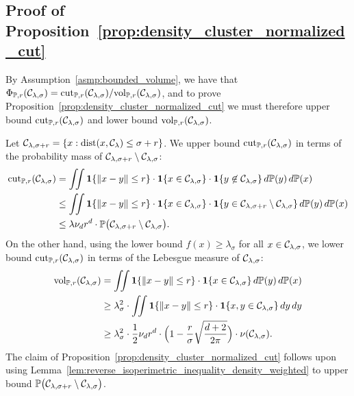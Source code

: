 \subsection{Proof of Proposition~\ref{prop:density_cluster_normalized_cut}}
\label{subsec:density_cluster_ncut}
By Assumption~\ref{asmp:bounded_volume}, we have that $\Phi_{\mathbb{P},r}(\mathcal{C}_{\lambda,\sigma}) = \mathrm{cut}_{\mathbb{P},r}(\mathcal{C}_{\lambda,\sigma})/\mathrm{vol}_{\mathbb{P},r}(\mathcal{C}_{\lambda,\sigma})$, and to prove Proposition~\ref{prop:density_cluster_normalized_cut} we must therefore upper bound $\mathrm{cut}_{\mathbb{P},r}(\mathcal{C}_{\lambda,\sigma})$ and lower bound $\mathrm{vol}_{\mathbb{P},r}(\mathcal{C}_{\lambda,\sigma})$. 

Let $\mathcal{C}_{\lambda,\sigma + r} = \{x: \mathrm{dist}(x,\mathcal{C}_{\lambda}) \leq \sigma + r\}$. We upper bound $\mathrm{cut}_{\mathbb{P},r}(\mathcal{C}_{\lambda,\sigma})$ in terms of the probability mass of $\mathcal{C}_{\lambda,\sigma + r} \setminus \mathcal{C}_{\lambda,\sigma}$:
\begin{align*}
\mathrm{cut}_{\mathbb{P},r}(\mathcal{C}_{\lambda,\sigma}) & = \iint \mathbf{1}\{\|x - y\| \leq r \} \cdot \mathbf{1}\{x \in \mathcal{C}_{\lambda,\sigma}\} \cdot \mathbf{1}\{y \not\in \mathcal{C}_{\lambda,\sigma} \} \,d\mathbb{P}(y) \,d\mathbb{P}(x) \\
& \leq  \iint \mathbf{1}\{\|x - y\| \leq r \} \cdot \mathbf{1}\{x \in \mathcal{C}_{\lambda,\sigma}\} \cdot \mathbf{1}\{y \in \mathcal{C}_{\lambda,\sigma + r} \setminus \mathcal{C}_{\lambda,\sigma}  \} \,d\mathbb{P}(y) \,d\mathbb{P}(x) \\
& \leq \lambda \nu_d r^d \cdot \mathbb{P}\bigl(\mathcal{C}_{\lambda,\sigma + r} \setminus \mathcal{C}_{\lambda,\sigma}\bigr).
\end{align*}
On the other hand, using the lower bound $f(x) \geq \lambda_{\sigma} $ for all $x \in \mathcal{C}_{\lambda,\sigma}$, we lower bound $\mathrm{cut}_{\mathbb{P},r}(\mathcal{C}_{\lambda,\sigma})$ in terms of the Lebesgue measure of $\mathcal{C}_{\lambda,\sigma}$:
\begin{align*}
\mathrm{vol}_{\mathbb{P},r}(\mathcal{C}_{\lambda,\sigma}) & = \iint \mathbf{1}\{\|x - y\| \leq r \} \cdot \mathbf{1}\{x \in \mathcal{C}_{\lambda,\sigma}\} \,d\mathbb{P}(y) \,d\mathbb{P}(x) \\
& \geq \lambda_{\sigma}^2 \cdot \iint \mathbf{1}\{\|x - y\| \leq r \} \cdot \mathbf{1}\{x,y \in \mathcal{C}_{\lambda,\sigma}\} \,dy \,dy \\
& \geq \lambda_{\sigma}^2 \cdot \frac{1}{2} \nu_d r^d \cdot \Bigl(1 - \frac{r}{\sigma} \sqrt{\frac{d + 2}{2\pi}}\Bigr) \cdot \nu(\mathcal{C}_{\lambda,\sigma}).
\end{align*}
The claim of Proposition~\ref{prop:density_cluster_normalized_cut} follows upon using Lemma~\ref{lem:reverse_isoperimetric_inequality_density_weighted} to upper bound $\mathbb{P}\bigl(\mathcal{C}_{\lambda,\sigma + r} \setminus \mathcal{C}_{\lambda,\sigma}\bigr)$.

